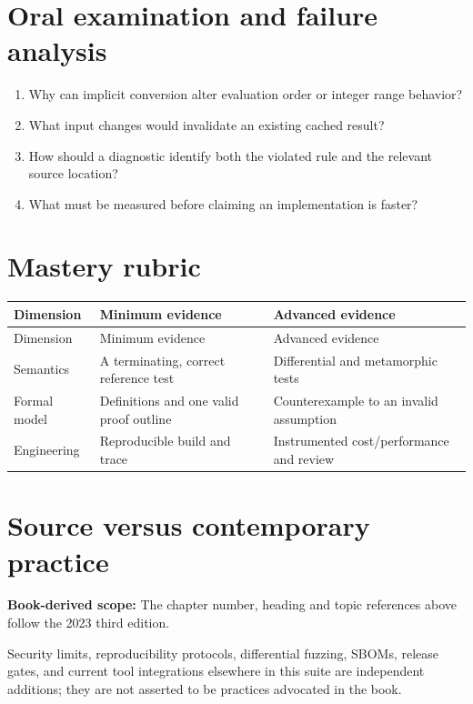 \documentclass[10pt,letterpaper]{article}
\begin{document}
\section{Oral examination and failure analysis}
\begin{enumerate}
\item Why can implicit conversion alter evaluation order or integer range behavior?
\item What input changes would invalidate an existing cached result?
\item How should a diagnostic identify both the violated rule and the relevant source location?
\item What must be measured before claiming an implementation is faster?
\end{enumerate}

\section{Mastery rubric}
\begin{longtable}{|>{\raggedright\arraybackslash}p{}|>{\raggedright\arraybackslash}p{}|>{\raggedright\arraybackslash}p{}|}
\hline
Dimension & Minimum evidence & Advanced evidence\\ \hline\endfirsthead
\hline
Dimension & Minimum evidence & Advanced evidence\\ \hline\endhead
Semantics & A terminating, correct reference test & Differential and metamorphic tests\\ \hline
Formal model & Definitions and one valid proof outline & Counterexample to an invalid assumption\\ \hline
Engineering & Reproducible build and trace & Instrumented cost/performance and review\\ \hline
\end{longtable}

\section{Source versus contemporary practice}
\textbf{Book-derived scope:} The chapter number, heading and topic references above follow the 2023 third edition.\par\modern Security limits, reproducibility protocols, differential fuzzing, SBOMs, release gates, and current tool integrations elsewhere in this suite are independent additions; they are not asserted to be practices advocated in the book.
\end{document}
